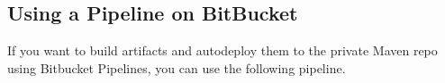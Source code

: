 \documentclass[letterpaper,10pt,english]{sphinxmanual}
\begin{document}
\begin{quote}

\begin{sphinxVerbatim}[commandchars=\\\{\}]
\end{sphinxVerbatim}
\end{quote}


\subsection{Using a Pipeline on BitBucket}
\label{\detokenize{private_maven_repo:using-a-pipeline-on-bitbucket}}
If you want to build artifacts and autodeploy them to the private Maven repo using Bitbucket Pipelines, you can use the following pipeline.
\end{document}
